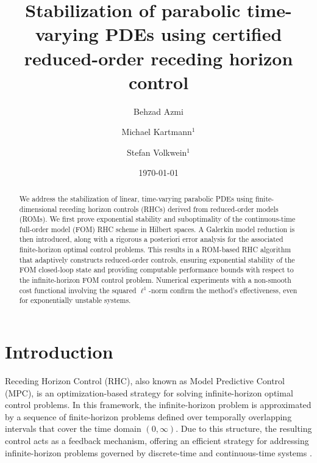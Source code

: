 \documentclass{m2an}
\begin{document}
\title{Stabilization of parabolic time-varying PDEs using certified reduced-order receding horizon control}%
%
\author{Behzad Azmi}\address{Department of Mathematics and Statistics, University of Konstanz, D-78457 Konstanz, \{behzad.azmi, michael.kartmann, stefan.volkwein\}@uni-konstanz.de.}
\author{Michael Kartmann$^1$}
\author{Stefan Volkwein$^1$}
%
\date{\today}
%
\begin{abstract} 
We address the stabilization of linear, time-varying parabolic PDEs using finite-dimen\-sional receding horizon controls (RHCs) derived from reduced-order models (ROMs). We first prove exponential stability and suboptimality of the continuous-time full-order model (FOM) RHC scheme in Hilbert spaces. A Galerkin model reduction is then introduced, along with a rigorous a posteriori error analysis for the associated finite-horizon optimal control problems. This results in a ROM-based RHC algorithm that adaptively constructs reduced-order controls, ensuring exponential stability of the FOM closed-loop state and providing computable performance bounds with respect to the infinite-horizon FOM control problem. Numerical experiments with a non-smooth cost functional involving the squared $\ell^1$-norm confirm the method’s effectiveness, even for exponentially unstable systems.
%
\end{abstract}
%
%
%
%
\maketitle

\section{Introduction}
%
Receding Horizon Control (RHC), also known as Model Predictive Control (MPC), is an optimization-based strategy for solving infinite-horizon optimal control problems. In this framework, the infinite-horizon problem is approximated by a sequence of finite-horizon problems defined over temporally overlapping intervals that cover the time domain \((0,\infty)\). Due to this structure, the resulting control acts as a feedback mechanism, offering an efficient strategy for addressing infinite-horizon problems governed by discrete-time \cite{grune2017nonlinear,GR08} and continuous-time systems \cite{RMD19,RA12}. 
\end{document}
